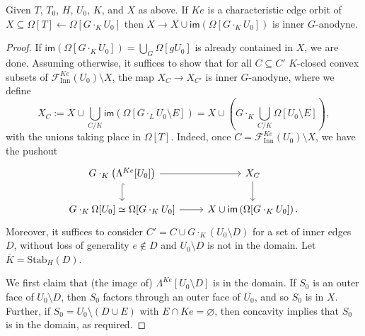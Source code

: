 \documentclass[a4paper,10pt,draft]{article}%
\numberwithin{equation}{section}%
\numberwithin{figure}{section}
\begin{document}
\begin{proposition}
      \label{CHAR_HORN_THM}
      Given $T$, $T_0$, $H$, $U_0$, $K$, and $X$ as above.
      If $K e$ is a characteristic edge orbit of $X \subseteq \Omega[T] \leftarrow \Omega[G \cdot_K U_0]$
      then $X \to X \cup \mathsf{im}\left(\Omega[G \cdot_K U_0] \right)$ is inner $G$-anodyne.
\end{proposition}
\begin{proof}
      If $\mathsf{im}(\Omega[G \cdot_K U_0]) = \bigcup_G \Omega[g U_0]$ is already contained in $X$, we are done.
      Assuming otherwise, it suffices to show that for all
      $C \subseteq C'$ $K$-closed convex subsets of $\mathscr{F}_{\mathrm{Inn}}^{K e}(U_0) \setminus X$, the map
      $X_C \to X_{C'}$ is inner $G$-anodyne, where we define
      \begin{equation}
            X_C := X \cup \mathop{\bigcup}\limits_{C/K} \mathsf{im}\left(\Omega[G \cdot_L U_0 \setminus E] \right)
            = X \cup \left( G \cdot_K \mathop{\bigcup}\limits_{C/K} \Omega[U_0 \setminus E] \right),
      \end{equation}
      with the unions taking place in $\Omega[T]$.
      Indeed, once $C = \mathscr{F}_{\mathrm{Inn}}^{K e}(U_0) \setminus X$, we have the pushout
      \begin{equation}
            \begin{tikzcd}
                  G \cdot_K \left( \Lambda^{K e}[U_0] \right) \arrow[d, hookrightarrow] \arrow[r]
                  &
                  X_C \arrow[d]
                  \\
                  G \cdot_K \Omega[U_0] \simeq \Omega[G \cdot_K U_0] \arrow[r]
                  &
                  X \cup \mathsf{im}\left(\Omega[G \cdot_K U_0]\right).
            \end{tikzcd}
      \end{equation}
      Moreover, it suffices to consider $C' = C \cup G\cdot_K(U_0 \setminus D)$ for a set of inner edges $D$,
      without loss of generality $e \not\in D$ and $U_0 \setminus D$ is not in the domain.
      Let $\bar K = \mathrm{Stab}_H(D)$.

      We first claim that (the image of) $\Lambda^{K e}[U_0 \setminus D]$ is in the domain.
      If $S_0$ is an outer face of $U_0 \setminus D$, then
      $S_0$ factors through an outer face of $U_0$, and so $S_0$ is in $X$.
      Further, if $S_0 = U_0 \setminus (D \cup E)$ with $E \cap K e = \varnothing$,
      then concavity implies that $S_0$ is in the domain, as required.


\end{proof}
\end{document}

